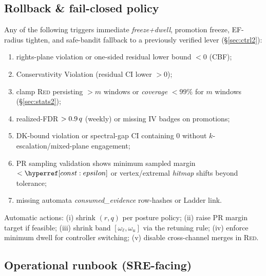\subsection*{Rollback \& fail-closed policy}
Any of the following triggers immediate \emph{freeze+dwell}, promotion freeze, EF-radius tighten, and safe-bandit fallback to a previously verified lever (\S\ref{sec:ctrl2}):
\begin{enumerate}[leftmargin=*]
\item rights-plane violation or one-sided residual lower bound $<0$ (CBF); 
\item \textsf{Conservativity Violation} (residual CI lower $>0$);
\item clamp \textsc{Red} persisting $>m$ windows or \emph{coverage} $<99\%$ for $m$ windows (\S\ref{sec:stats2});
\item realized-FDR $>0.9\,q$ (weekly) or missing IV badges on promotions;
\item DK-bound violation or spectral-gap CI containing $0$ without $k$-escalation/mixed-plane engagement;
\item PR sampling validation shows minimum sampled margin $<\constref{epsilon}$ or vertex/extremal \emph{hitmap} shifts beyond tolerance;
\item missing automata \emph{consumed\_evidence} row-hashes or Ladder link.
\end{enumerate}
Automatic actions: (i) shrink $(r,q)$ per posture policy; (ii) raise PR margin target if feasible; (iii) shrink band $[\omega_\ell,\omega_u]$ via the retuning rule; (iv) enforce minimum dwell for controller switching; (v) disable cross-channel merges in \textsc{Red}.

\subsection*{Operational runbook (SRE-facing)}

